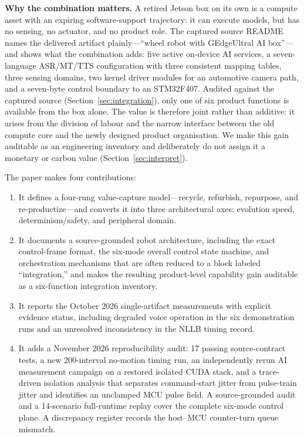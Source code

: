 \documentclass[conference]{IEEEtran}
\begin{document}
\textbf{Why the combination matters.} A retired Jetson box on its own is a compute asset with an expiring software-support trajectory: it can execute models, but has no sensing, no actuator, and no product role. The captured source README names the delivered artifact plainly---``wheel robot with GEdgeUltral AI box''---and shows what the combination adds: five active on-device AI services, a seven-language ASR/MT/TTS configuration with three consistent mapping tables, three sensing domains, two kernel driver modules for an automotive camera path, and a seven-byte control boundary to an STM32F407. Audited against the captured source (Section~\ref{sec:integration}), only one of six product functions is available from the box alone. The value is therefore joint rather than additive: it arises from the division of labour and the narrow interface between the old compute core and the newly designed product organisation. We make this gain auditable as an engineering inventory and deliberately do not assign it a monetary or carbon value (Section~\ref{sec:interpret}).

The paper makes four contributions:
\begin{enumerate}
\item It defines a four-rung value-capture model---recycle, refurbish, repurpose, and re-productize---and converts it into three architectural axes: evolution speed, determinism/safety, and peripheral domain.
\item It documents a source-grounded robot architecture, including the exact control-frame format, the six-mode overall control state machine, and orchestration mechanisms that are often reduced to a block labeled ``integration,'' and makes the resulting product-level capability gain auditable as a six-function integration inventory.
\item It reports the October 2026 single-artifact measurements with explicit evidence status, including degraded voice operation in the six demonstration runs and an unresolved inconsistency in the NLLB timing record.
\item It adds a November 2026 reproducibility audit: 17 passing source-contract tests, a new 200-interval no-motion timing run, an independently rerun AI measurement campaign on a restored isolated CUDA stack, and a trace-driven isolation analysis that separates command-start jitter from pulse-train jitter and identifies an unclamped MCU pulse field. A source-grounded audit and a 14-scenario full-runtime replay cover the complete six-mode control plane. A discrepancy register records the host--MCU counter-turn queue mismatch.
\end{enumerate}
\end{document}
